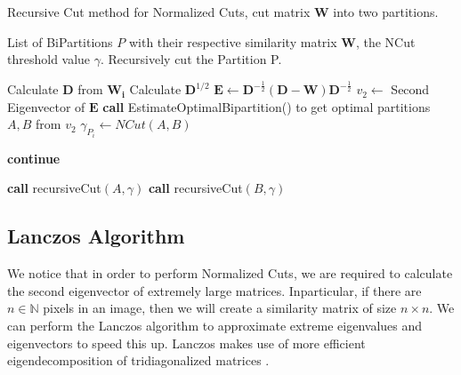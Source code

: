\documentclass[11pt,openany]{book}
\begin{document}
\begin{algorithmic}
    \label{alg:recursiveCut_ncuts}
    \begin{algorithm}
        \caption{Recursive Cut method for Normalized Cuts, cut matrix $\mathbf{W}$ into two partitions.}
        \Require List of BiPartitions $P$ with their respective similarity matrix $\mathbf{W}$, the NCut threshold value $\gamma$.
        \Ensure Recursively cut the Partition P.
        
        
                \State Calculate $\mathbf{D}$ from $\mathbf{W_i}$
                \State Calculate $\mathbf{D}^{1/2}$
                \State $\mathbf{E} \gets \mathbf{D}^{-\frac{1}{2}} (\mathbf{D} - \mathbf{W}) \mathbf{D}^{-\frac{1}{2}}$
                \State $v_2 \gets $ Second Eigenvector of $\mathbf{E}$
                \State \textbf{call} EstimateOptimalBipartition() to get optimal partitions $A,B$ from $v_2$
                \State $\gamma_{P_i} \gets NCut(A,B)$ 
                
                 
                    \State \textbf{continue}
                \EndIf
            
                    \State \textbf{call} recursiveCut$(A, \gamma)$
                \EndIf
                    \State \textbf{call} recursiveCut$(B, \gamma)$
                \EndIf
            \EndFor
        \EndProcedure
    \end{algorithm}
\end{algorithmic}

\subsection{Lanczos Algorithm}
We notice that in order to perform Normalized Cuts, we are required to calculate the second eigenvector of extremely large matrices. Inparticular, if there are $n \in \mathbb{N}$ pixels in an image, then we will create a similarity matrix of size $n \times n$. We can perform the Lanczos algorithm to approximate extreme eigenvalues and eigenvectors to speed this up. Lanczos makes use of more efficient eigendecomposition of tridiagonalized matrices \cite{normalized_cuts_algorithm}.
\end{document}
